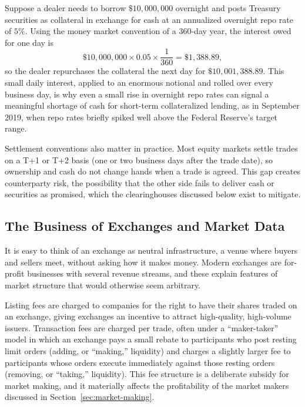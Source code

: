 \documentclass[../ai_in_finance]{subfiles}
\begin{document}
Suppose a dealer needs to borrow $\$10{,}000{,}000$ overnight and posts Treasury securities as collateral in exchange for cash at an annualized overnight repo rate of $5\%$. Using the money market convention of a 360-day year, the interest owed for one day is
\begin{equation*}
\$10{,}000{,}000 \times 0.05 \times \frac{1}{360} = \$1{,}388.89,
\end{equation*}
so the dealer repurchases the collateral the next day for $\$10{,}001{,}388.89$. This small daily interest, applied to an enormous notional and rolled over every business day, is why even a small rise in overnight repo rates can signal a meaningful shortage of cash for short-term collateralized lending, as in September 2019, when repo rates briefly spiked well above the Federal Reserve's target range.

Settlement conventions also matter in practice. Most equity markets settle trades on a T+1 or T+2 basis (one or two business days after the trade date), so ownership and cash do not change hands when a trade is agreed. This gap creates counterparty risk, the possibility that the other side fails to deliver cash or securities as promised, which the clearinghouses discussed below exist to mitigate.

\subsection{The Business of Exchanges and Market Data}

It is easy to think of an exchange as neutral infrastructure, a venue where buyers and sellers meet, without asking how it makes money. Modern exchanges are for-profit businesses with several revenue streams, and these explain features of market structure that would otherwise seem arbitrary.

Listing fees are charged to companies for the right to have their shares traded on an exchange, giving exchanges an incentive to attract high-quality, high-volume issuers. Transaction fees are charged per trade, often under a ``maker-taker'' model in which an exchange pays a small rebate to participants who post resting limit orders (adding, or ``making,'' liquidity) and charges a slightly larger fee to participants whose orders execute immediately against those resting orders (removing, or ``taking,'' liquidity). This fee structure is a deliberate subsidy for market making, and it materially affects the profitability of the market makers discussed in Section~\ref{sec:market-making}.
\end{document}
